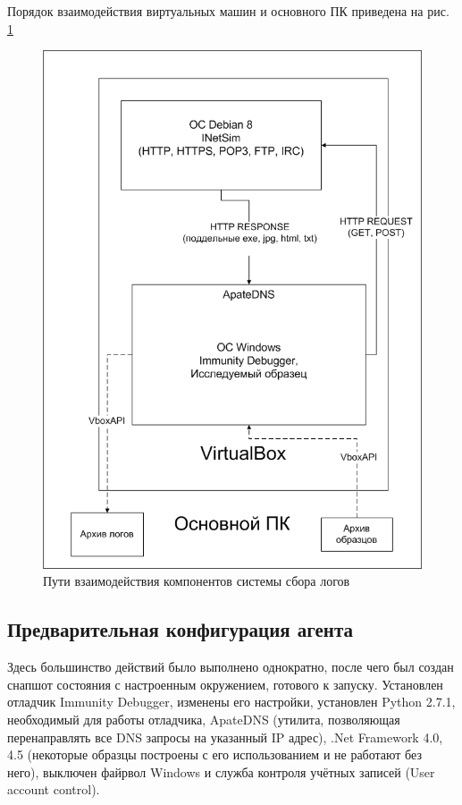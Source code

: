 Порядок взаимодействия виртуальных машин и основного ПК приведена на рис. \ref {fig:vmcycle}
\begin {figure}[h!]
	\centering
	\includegraphics[width=\linewidth] {img/vmcycle.png}
	\caption {Пути взаимодействия компонентов системы сбора логов}
	\label {fig:vmcycle}
\end {figure}

\subsection {Предварительная конфигурация агента}
Здесь большинство действий было выполнено однократно, после чего был создан снапшот состояния с настроенным окружением, готового к запуску. Установлен отладчик Immunity Debugger, изменены его настройки, установлен Python 2.7.1, необходимый для работы отладчика, ApateDNS (утилита, позволяющая перенаправлять все DNS запросы на указанный IP адрес), .Net Framework 4.0, 4.5 (некоторые образцы построены с его использованием и не работают без него), выключен файрвол Windows и служба контроля учётных записей (User account control).

